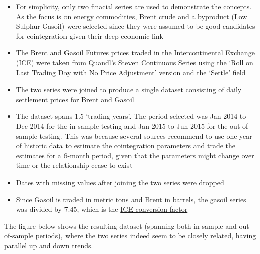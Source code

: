 \documentclass{article}
\providecommand{\tightlist}{%
      \setlength{\itemsep}{0pt}\setlength{\parskip}{0pt}}
\begin{document}
    \begin{itemize}
\tightlist
\item
  For simplicity, only two finacial series are used to demonstrate the
  concepts. As the focus is on energy commodities, Brent crude and a
  byproduct (Low Sulphur Gasoil) were selected since they were assumed
  to be good candidates for cointegration given their deep economic link
\item
  The
  \href{https://www.theice.com/products/219/Brent-Crude-Futures}{Brent}
  and
  \href{https://www.theice.com/products/34361119/Low-Sulphur-Gasoil-Futures}{Gasoil}
  Futures prices traded in the Intercontinental Exchange (ICE) were
  taken from
  \href{https://www.quandl.com/data/SCF/documentation/about}{Quandl's
  Steven Continuous Series} using the `Roll on Last Trading Day with No
  Price Adjustment' version and the `Settle' field
\item
  The two series were joined to produce a single dataset consisting of
  daily settlement prices for Brent and Gasoil
\item
  The dataset spans 1.5 `trading years'. The period selected was
  Jan-2014 to Dec-2014 for the in-sample testing and Jan-2015 to
  Jun-2015 for the out-of-sample testing. This was because several
  sources recommend to use one year of historic data to estimate the
  cointegration parameters and trade the estimates for a 6-month period,
  given that the parameters might change over time or the relationship
  cease to exist
\item
  Dates with missing values after joining the two series were dropped
\item
  Since Gasoil is traded in metric tons and Brent in barrels, the gasoil
  series was divided by 7.45, which is the
  \href{https://www.theice.com/publicdocs/futures/ICE_Gas_Oil_Crack.pdf}{ICE
  conversion factor}
\end{itemize}

The figure below shows the resulting dataset (spanning both in-sample
and out-of-sample periods), where the two series indeed seem to be
closely related, having parallel up and down trends.
\end{document}
